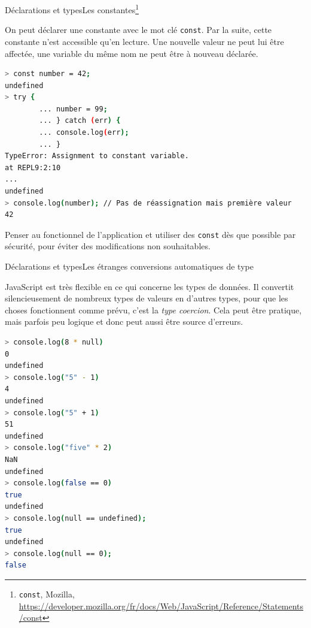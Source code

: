 \documentclass{beamer}
\begin{document}
    \begin{frame}[fragile]{Déclarations et types}{Les constantes\footnote{\lstinline{const}, Mozilla, \url{https://developer.mozilla.org/fr/docs/Web/JavaScript/Reference/Statements/const}}}
        \begin{footnotesize}
            On peut déclarer une constante avec le mot clé \lstinline{const}.
            Par la suite, cette constante n'est accessible qu'en lecture.
            Une nouvelle valeur ne peut lui être affectée, une variable du même nom ne peut être à nouveau déclarée.
            \begin{lstlisting}[language=Bash,title={\scriptsize{Script JavaScript}},basicstyle=\tiny\ttfamily]
> const number = 42;
undefined
> try {
        ... number = 99;
        ... } catch (err) {
        ... console.log(err);
        ... }
TypeError: Assignment to constant variable.
at REPL9:2:10
...
undefined
> console.log(number); // Pas de réassignation mais première valeur
42
            \end{lstlisting}
            \begin{dangercolorbox}
                Penser au fonctionnel de l'application et utiliser des \lstinline{const} dès que possible par sécurité, pour éviter des modifications non souhaitables.
            \end{dangercolorbox}
        \end{footnotesize}
    \end{frame}

    \begin{frame}[fragile]{Déclarations et types}{Les étranges conversions automatiques de type}
        \begin{footnotesize}
            JavaScript est très flexible en ce qui concerne les types de données.
            Il convertit silencieusement de nombreux types de valeurs en d'autres types, pour que les choses fonctionnent comme prévu, c'est la \textit{type coercion}.
            Cela peut être pratique, mais parfois peu logique et donc peut aussi être source d'erreurs.
        \end{footnotesize}
        \begin{lstlisting}[language=Bash,title={\scriptsize{Node.js}},basicstyle=\tiny\ttfamily]
> console.log(8 * null)
0
undefined
> console.log("5" - 1)
4
undefined
> console.log("5" + 1)
51
undefined
> console.log("five" * 2)
NaN
undefined
> console.log(false == 0)
true
undefined
> console.log(null == undefined);
true
undefined
> console.log(null == 0);
false
        \end{lstlisting}
    \end{frame}
\end{document}
